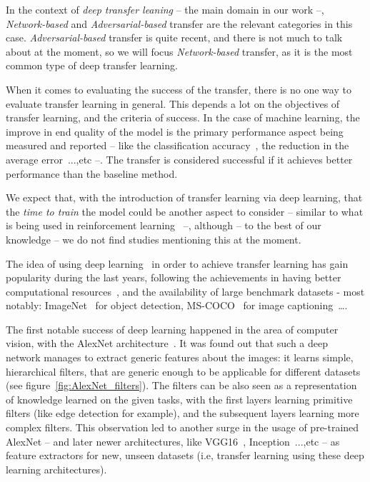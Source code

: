   \par In the context of \textit{deep transfer leaning} -- the main domain in our work --, \textit{Network-based} and \textit{Adversarial-based} transfer are the relevant categories in this case. \textit{Adversarial-based} transfer is quite recent, and there is not much to talk about at the moment, so we will focus \textit{Network-based} transfer, as it is the most common type of deep transfer learning.

  \par When it comes to evaluating the success of the transfer, there is no one way to evaluate transfer learning in general. This depends a lot on the objectives of transfer learning, and the criteria of success. In the case of machine learning, the improve in end quality of the model is the primary performance aspect being measured and reported -- like the classification accuracy~\citep{chattopadhyay2012multisource,long2013transfer,pan2010cross,glorot2011domain}, the reduction in the average error~\citep{pan2010domain}...,etc --. The transfer is considered successful if it achieves better performance than the baseline method.

  \par We expect that, with the introduction of transfer learning via deep learning, that the \textit{time to train} the model could be another aspect to consider -- similar to what is being used in reinforcement learning~\citep{taylor2007cross} --, although -- to the best of our knowledge -- we do not find studies mentioning this at the moment.

  \par The idea of using deep learning~\citep{lecun2015deep} in order to achieve transfer learning has gain popularity during the last years, following the achievements in having better computational resources~\citep{raina2009large}, and the availability of large benchmark datasets - most notably: ImageNet~\citep{imagenet_cvpr09} for object detection, MS-COCO~\citep{2014arXiv1405.0312L} for image captioning~\ldots.

  \par The first notable success of deep learning happened in the area of computer vision, with the AlexNet architecture~\citep{krizhevsky2012imagenet}. It was found out that such a deep network manages to extract generic features about the images: it learns simple, hierarchical filters, that are generic enough to be applicable for different datasets (see figure~\ref{fig:AlexNet_filters}). The filters can be also seen as a representation of knowledge learned on the given tasks, with the first layers learning primitive filters (like edge detection for example), and the subsequent layers learning more complex filters. This observation led to another surge in the usage of pre-trained AlexNet -- and later newer architectures, like VGG16~\citep{simonyan2014very}, Inception~\citep{szegedy2015going}...,etc -- as feature extractors for new, unseen datasets (i.e, transfer learning using these deep learning architectures).


